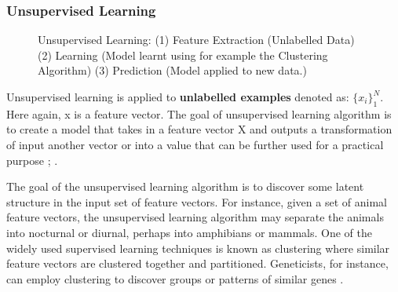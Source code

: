\subsubsection{Unsupervised Learning}
\begin{figure}[H]
	\centering
	\caption{Unsupervised Learning: (1) Feature Extraction (Unlabelled Data) (2) Learning (Model learnt using for example the Clustering Algorithm) (3) Prediction (Model applied to new data.)}
\end{figure}
Unsupervised learning is applied to \textbf{unlabelled examples} denoted as: $\{x_i\}^N_1$. Here again, x is a feature vector. The goal of unsupervised learning algorithm is to create a model that takes in a feature vector X and outputs a transformation of input another vector or into a value that can be further used for a practical purpose \parencite[264]{mitchell_machine_1997}; \parencite[264]{guttag_introduction_2016}. 

The goal of the unsupervised learning algorithm is to discover some latent structure in the input set of feature vectors. For instance, given a set of animal feature vectors, the unsupervised learning algorithm may separate the animals into nocturnal or diurnal, perhaps into amphibians or mammals. One of the widely used supervised learning techniques is known as clustering where similar feature vectors are clustered together and partitioned. Geneticists, for instance, can employ clustering to discover groups or patterns of similar genes \parencite[265]{guttag_introduction_2016}.

\newpage
